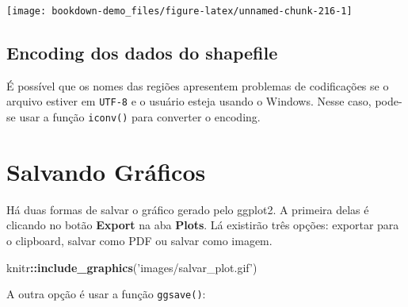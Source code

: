 \documentclass[]{book}
\newenvironment{Shaded}{\begin{snugshade}}{\end{snugshade}}
\newcommand{\KeywordTok}[1]{\textcolor[rgb]{0.13,0.29,0.53}{\textbf{#1}}}
\newcommand{\DataTypeTok}[1]{\textcolor[rgb]{0.13,0.29,0.53}{#1}}
\newcommand{\StringTok}[1]{\textcolor[rgb]{0.31,0.60,0.02}{#1}}
\newcommand{\OperatorTok}[1]{\textcolor[rgb]{0.81,0.36,0.00}{\textbf{#1}}}
\newcommand{\NormalTok}[1]{#1}
\begin{document}
\begin{center}\texttt{[image: bookdown-demo\_files/figure-latex/unnamed-chunk-216-1]} \end{center}

\subsection{Encoding dos dados do
shapefile}\label{encoding-dos-dados-do-shapefile}

É possível que os nomes das regiões apresentem problemas de codificações
se o arquivo estiver em \texttt{UTF-8} e o usuário esteja usando o
Windows. Nesse caso, pode-se usar a função \texttt{iconv()} para
converter o encoding.

\begin{Shaded}
\end{Shaded}

\section{Salvando Gráficos}\label{salvando-graficos}

Há duas formas de salvar o gráfico gerado pelo ggplot2. A primeira delas
é clicando no botão \textbf{Export} na aba \textbf{Plots}. Lá existirão
três opções: exportar para o clipboard, salvar como PDF ou salvar como
imagem.

\begin{Shaded}
\begin{Highlighting}[]
\NormalTok{knitr}\OperatorTok{::}\KeywordTok{include_graphics}\NormalTok{(}\StringTok{'images/salvar_plot.gif'}\NormalTok{)}
\end{Highlighting}
\end{Shaded}

A outra opção é usar a função \texttt{ggsave()}:
\end{document}
